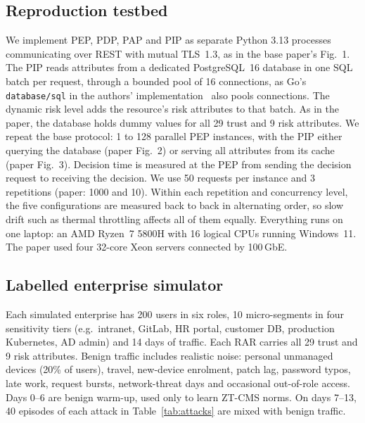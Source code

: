 \documentclass[conference,a4paper]{IEEEtran}
\begin{document}
\subsection{Reproduction testbed}
We implement PEP, PDP, PAP and PIP as separate Python 3.13 processes communicating over REST with mutual TLS~1.3, as in the base paper's Fig.~1. The PIP reads attributes from a dedicated PostgreSQL~16 database in one SQL batch per request, through a bounded pool of 16 connections, as Go's \texttt{database/sql} in the authors' implementation~\cite{repo} also pools connections. The dynamic risk level adds the resource's risk attributes to that batch. As in the paper, the database holds dummy values for all 29 trust and 9 risk attributes. We repeat the base protocol: 1 to 128 parallel PEP instances, with the PIP either querying the database (paper Fig.~2) or serving all attributes from its cache (paper Fig.~3). Decision time is measured at the PEP from sending the decision request to receiving the decision. We use 50 requests per instance and 3 repetitions (paper: 1000 and 10). Within each repetition and concurrency level, the five configurations are measured back to back in alternating order, so slow drift such as thermal throttling affects all of them equally. Everything runs on one laptop: an AMD Ryzen~7 5800H with 16 logical CPUs running Windows~11. The paper used four 32-core Xeon servers connected by 100\,GbE.

\subsection{Labelled enterprise simulator}
Each simulated enterprise has 200 users in six roles, 10 micro-segments in four sensitivity tiers (e.g.\ intranet, GitLab, HR portal, customer DB, production Kubernetes, AD admin) and 14 days of traffic. Each RAR carries all 29 trust and 9 risk attributes. Benign traffic includes realistic noise: personal unmanaged devices (20\% of users), travel, new-device enrolment, patch lag, password typos, late work, request bursts, network-threat days and occasional out-of-role access. Days 0--6 are benign warm-up, used only to learn ZT-CMS norms. On days 7--13, 40 episodes of each attack in Table~\ref{tab:attacks} are mixed with benign traffic.
\end{document}
